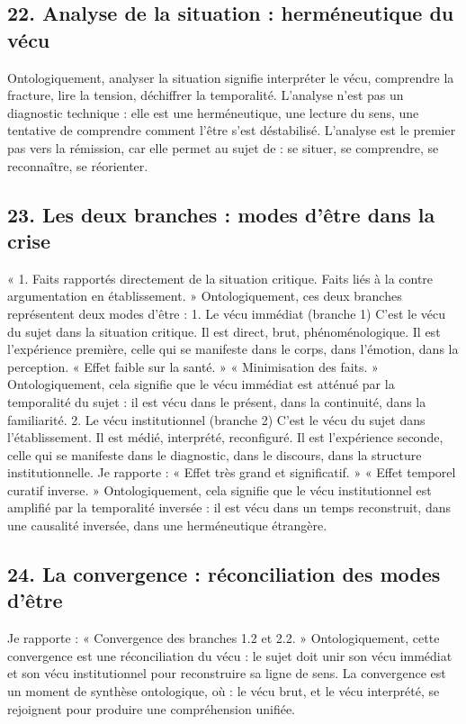\documentclass[12pt,letterpaper,oneside]{article}
\begin{document}
\subsection*{22. Analyse de la situation : herméneutique du vécu}
Ontologiquement, analyser la situation signifie interpréter le vécu, comprendre la fracture, lire la tension, déchiffrer la temporalité. L’analyse n’est pas un diagnostic technique : elle est une herméneutique, une lecture du sens, une tentative de comprendre comment l’être s’est déstabilisé.
L’analyse est le premier pas vers la rémission, car elle permet au sujet de :
	se situer,
	se comprendre,
	se reconnaître,
	se réorienter.

\subsection*{23. Les deux branches : modes d’être dans la crise}
« 1. Faits rapportés directement de la situation critique.
	Faits liés à la contre argumentation en établissement. »
Ontologiquement, ces deux branches représentent deux modes d’être :
1. Le vécu immédiat (branche 1)
C’est le vécu du sujet dans la situation critique. Il est direct, brut, phénoménologique. Il est l’expérience première, celle qui se manifeste dans le corps, dans l’émotion, dans la perception.
« Effet faible sur la santé. » « Minimisation des faits. »
Ontologiquement, cela signifie que le vécu immédiat est atténué par la temporalité du sujet : il est vécu dans le présent, dans la continuité, dans la familiarité.
2. Le vécu institutionnel (branche 2)
C’est le vécu du sujet dans l’établissement. Il est médié, interprété, reconfiguré. Il est l’expérience seconde, celle qui se manifeste dans le diagnostic, dans le discours, dans la structure institutionnelle.
Je rapporte :
« Effet très grand et significatif. » « Effet temporel curatif inverse. »
Ontologiquement, cela signifie que le vécu institutionnel est amplifié par la temporalité inversée : il est vécu dans un temps reconstruit, dans une causalité inversée, dans une herméneutique étrangère.

\subsection*{24. La convergence : réconciliation des modes d’être}
Je rapporte :
« Convergence des branches 1.2 et 2.2. »
Ontologiquement, cette convergence est une réconciliation du vécu : le sujet doit unir son vécu immédiat et son vécu institutionnel pour reconstruire sa ligne de sens.
La convergence est un moment de synthèse ontologique, où :
	le vécu brut,
	et le vécu interprété,
se rejoignent pour produire une compréhension unifiée.
\end{document}
